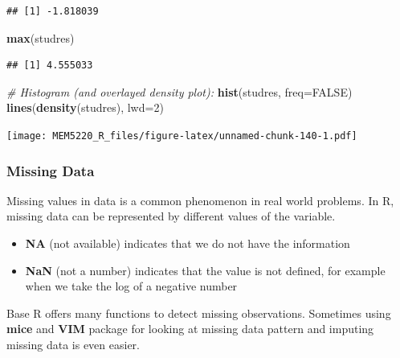 \documentclass[]{book}
\newenvironment{Shaded}{\begin{snugshade}}{\end{snugshade}}
\newcommand{\CommentTok}[1]{\textcolor[rgb]{0.56,0.35,0.01}{\textit{#1}}}
\newcommand{\DataTypeTok}[1]{\textcolor[rgb]{0.13,0.29,0.53}{#1}}
\newcommand{\DecValTok}[1]{\textcolor[rgb]{0.00,0.00,0.81}{#1}}
\newcommand{\KeywordTok}[1]{\textcolor[rgb]{0.13,0.29,0.53}{\textbf{#1}}}
\newcommand{\NormalTok}[1]{#1}
\newcommand{\OtherTok}[1]{\textcolor[rgb]{0.56,0.35,0.01}{#1}}
\providecommand{\tightlist}{%
  \setlength{\itemsep}{0pt}\setlength{\parskip}{0pt}}
\begin{document}
\begin{verbatim}
## [1] -1.818039
\end{verbatim}

\begin{Shaded}
\begin{Highlighting}[]
\KeywordTok{max}\NormalTok{(studres)}
\end{Highlighting}
\end{Shaded}

\begin{verbatim}
## [1] 4.555033
\end{verbatim}

\begin{Shaded}
\begin{Highlighting}[]
\CommentTok{# Histogram (and overlayed density plot):}
\KeywordTok{hist}\NormalTok{(studres, }\DataTypeTok{freq=}\OtherTok{FALSE}\NormalTok{)}
\KeywordTok{lines}\NormalTok{(}\KeywordTok{density}\NormalTok{(studres), }\DataTypeTok{lwd=}\DecValTok{2}\NormalTok{)}
\end{Highlighting}
\end{Shaded}

\texttt{[image: MEM5220\_R\_files/figure-latex/unnamed-chunk-140-1.pdf]}

\hypertarget{missing-data}{%
\subsubsection{Missing Data}\label{missing-data}}

Missing values in data is a common phenomenon in real world problems. In R, missing data can be represented by different values of the variable.

\begin{itemize}
\tightlist
\item
  \textbf{NA} (not available) indicates that we do not have the information
\item
  \textbf{NaN} (not a number) indicates that the value is not defined, for example when we take the log of a negative number
\end{itemize}

Base R offers many functions to detect missing observations. Sometimes using \textbf{mice} and \textbf{VIM} package for looking at missing data pattern and imputing missing data is even easier.
\end{document}
